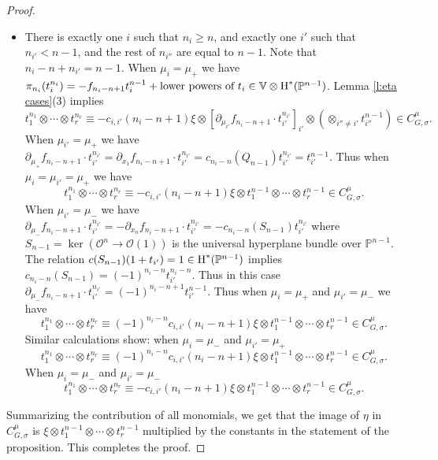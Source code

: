 \documentclass[reqno]{amsart}
\numberwithin{equation}{subsection}
\theoremstyle{definition}
\def\PP{\mathbb{P}}
\def\VV{\mathbb{V}}
\newcommand\cO{\mathcal{O}}
\newcommand\Sht{\textup{Sht}}
\newcommand\ot{\otimes}
\newcommand{\cohog}[2]{\textup{H}^{#1}({#2})}     %
\newcommand{\s}{\sigma}
\newcommand{\y}{\eta}
\newcommand{\z}{\zeta}
\newcommand{\om}{\omega}
\newcommand\pl{\partial}
\begin{document}
\begin{proof}
\begin{itemize}
    
    \item There is exactly one $i$ such that $n_i\ge n$, and exactly one $i'$ such that $n_{i'}<n-1$, and the rest of $n_{i''}$ are equal to $n-1$. Note that $n_i-n+n_{i'}=n-1$. When $\mu_{i}=\mu_+$ we have $\pi_{n_i}(t_i^{n_i})=-f_{n_i-n+1}t_i^{n-1}+\mbox{lower powers of } t_i\in \VV\ot \cohog{*}{\PP^{n-1}}$. Lemma \ref{l:eta cases}(3) implies
    \begin{equation*}
        t_1^{n_1}\ot \cdots \ot t_r^{n_r}\equiv -c_{i,i'}(n_i-n+1)\xi\ot [\pl_{\mu_{i'}}f_{n_i-n+1}\cdot t_{i'}^{n_{i'}}]_{i'}\ot (\ot_{i''\ne i'}t_{i''}^{n-1})\in C^\mu_{G,\s}.
    \end{equation*}
    When $\mu_{i'}=\mu_+$ we have $\pl_{\mu_+}f_{n_i-n+1}\cdot t_{i'}^{n_{i'}}=\pl_{x_1}f_{n_i-n+1}\cdot t_{i'}^{n_{i'}}=c_{n_i-n}(Q_{n-1})t_{i'}^{n_{i'}}=t_{i'}^{n-1}$. Thus when $\mu_{i}=\mu_{i'}=\mu_+$ we have
    \begin{equation*}
        t_1^{n_1}\ot \cdots \ot t_r^{n_r}\equiv -c_{i,i'}(n_i-n+1)\xi\ot t_1^{n-1}\ot\cdots \ot t_r^{n-1}\in C^\mu_{G,\s}.
    \end{equation*}    
    When $\mu_{i'}=\mu_-$ we have $\pl_{\mu_-}f_{n_i-n+1}\cdot t_{i'}^{n_{i'}}=-\pl_{x_n}f_{n_i-n+1}\cdot t_{i'}^{n_{i'}}=-c_{n_i-n}(S_{n-1})t_{i'}^{n_{i'}}$ where $S_{n-1}=\ker(\cO^n\to \cO(1))$ is the universal hyperplane bundle over $\PP^{n-1}$. The relation $c(S_{n-1})(1+t_{i'})=1\in \cohog{*}{\PP^{n-1}}$ implies $c_{n_i-n}(S_{n-1})=(-1)^{n_i-n}t_{i'}^{n_i-n}$. Thus in this case $\pl_{\mu_-}f_{n_i-n+1}\cdot t_{i'}^{n_{i'}}=(-1)^{n_i-n+1}t_{i'}^{n-1}$. Thus when $\mu_i=\mu_+$ and $\mu_{i'}=\mu_-$ we have
    \begin{equation*}
        t_1^{n_1}\ot \cdots \ot t_r^{n_r}\equiv (-1)^{n_i-n}c_{i,i'}(n_i-n+1)\xi\ot t_1^{n-1}\ot\cdots \ot t_r^{n-1}\in C^\mu_{G,\s}.
    \end{equation*}  
    Similar calculations show:
    when $\mu_i=\mu_-$ and $\mu_{i'}=\mu_+$
    \begin{equation*}
        t_1^{n_1}\ot \cdots \ot t_r^{n_r}\equiv (-1)^{n_i-n}c_{i,i'}(n_i-n+1)\xi\ot t_1^{n-1}\ot\cdots \ot t_r^{n-1}\in C^\mu_{G,\s}.
    \end{equation*}  
    When $\mu_i=\mu_-$ and $\mu_{i'}=\mu_-$
    \begin{equation*}
        t_1^{n_1}\ot \cdots \ot t_r^{n_r}\equiv -c_{i,i'}(n_i-n+1)\xi\ot t_1^{n-1}\ot\cdots \ot t_r^{n-1}\in C^\mu_{G,\s}.
    \end{equation*} 
\end{itemize}

Summarizing the contribution of all monomials, we get that the image of $\y$ in  $C^\mu_{G,\s}$ is  $\xi\ot t_1^{n-1}\ot\cdots\ot t_r^{n-1}$ multiplied by the constants in the statement of the proposition. This completes the proof.



\end{proof}
\end{document}
